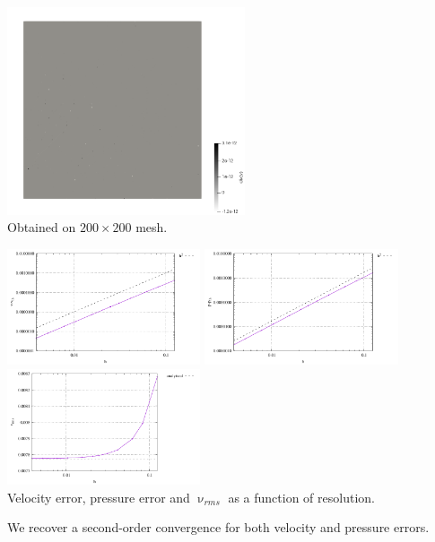 \begin{center}
\includegraphics[width=7cm]{python_codes/fieldstone_158/results/exp4/divv}\\
{\captionfont Obtained on $200\times 200$ mesh.}
\end{center} 

\begin{center}
\includegraphics[width=5.7cm]{python_codes/fieldstone_158/results/exp4/errv}
\includegraphics[width=5.7cm]{python_codes/fieldstone_158/results/exp4/errp}
\includegraphics[width=5.7cm]{python_codes/fieldstone_158/results/exp4/vrms}\\
{\captionfont Velocity error, pressure error and $\upnu_{rms}$ as a function of resolution.}
\end{center}

We recover a second-order convergence for both velocity and pressure errors.

